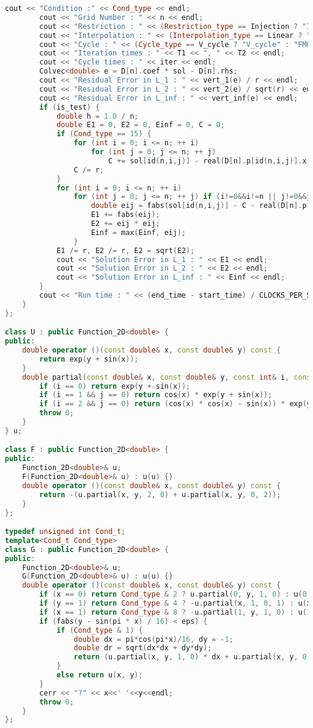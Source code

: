 \documentclass{ctexart}
\begin{document}
\begin{lstlisting}[language=c++]
		cout << "Condition :" << Cond_type << endl;
		cout << "Grid Number : " << n << endl;
		cout << "Restriction : " << (Restriction_type == Injection ? "Injection" : "Full Weighting") << endl;
		cout << "Interpolation : " << (Interpolation_type == Linear ? "Linear" : "Quadratic") << endl;
		cout << "Cycle : " << (Cycle_type == V_cycle ? "V_cycle" : "FMG") << endl;
		cout << "Iteration times : " << T1 << ", " << T2 << endl;
		cout << "Cycle times : " << iter << endl;
		Colvec<double> e = D[n].coef * sol - D[n].rhs;
		cout << "Residual Error in L_1 : " << vert_1(e) / r << endl;
		cout << "Residual Error in L_2 : " << vert_2(e) / sqrt(r) << endl;
		cout << "Residual Error in L_inf : " << vert_inf(e) << endl;
		if (is_test) {
			double h = 1.0 / n;
			double E1 = 0, E2 = 0, Einf = 0, C = 0;
			if (Cond_type == 15) {
				for (int i = 0; i <= n; ++ i)
					for (int j = 0; j <= n; ++ j)
						C += sol[id(n,i,j)] - real(D[n].p[id(n,i,j)].x, D[n].p[id(n,i,j)].y);
				C /= r;
			}
			for (int i = 0; i <= n; ++ i)
				for (int j = 0; j <= n; ++ j) if (i!=0&&i!=n || j!=0&&j!=n){
					double eij = fabs(sol[id(n,i,j)] - C - real(D[n].p[id(n,i,j)].x, D[n].p[id(n,i,j)].y));
					E1 += fabs(eij);
					E2 += eij * eij;
					Einf = max(Einf, eij);
				}
			E1 /= r, E2 /= r, E2 = sqrt(E2);
			cout << "Solution Error in L_1 : " << E1 << endl;
			cout << "Solution Error in L_2 : " << E2 << endl;
			cout << "Solution Error in L_inf : " << Einf << endl;
		}
		cout << "Run time : " << (end_time - start_time) / CLOCKS_PER_SEC << endl;
	}
};

class U : public Function_2D<double> {
public:
	double operator ()(const double& x, const double& y) const {
		return exp(y + sin(x));
	}
	double partial(const double& x, const double& y, const int& i, const int& j) const {
		if (i == 0) return exp(y + sin(x));
		if (i == 1 && j == 0) return cos(x) * exp(y + sin(x));
		if (i == 2 && j == 0) return (cos(x) * cos(x) - sin(x)) * exp(y + sin(x));
		throw 0;
	}
} u;

class F : public Function_2D<double> {
public:
	Function_2D<double>& u;
	F(Function_2D<double>& u) : u(u) {}
	double operator ()(const double& x, const double& y) const {
		return -(u.partial(x, y, 2, 0) + u.partial(x, y, 0, 2));
	}
};

typedef unsigned int Cond_t;
template<Cond_t Cond_type>
class G : public Function_2D<double> {
public:
	Function_2D<double>& u;
	G(Function_2D<double>& u) : u(u) {}
	double operator ()(const double& x, const double& y) const {
		if (x == 0) return Cond_type & 2 ? u.partial(0, y, 1, 0) : u(0, y) ;
		if (y == 1) return Cond_type & 4 ? -u.partial(x, 1, 0, 1) : u(x, 1);
		if (x == 1) return Cond_type & 8 ? -u.partial(1, y, 1, 0) : u(1, y);
		if (fabs(y - sin(pi * x) / 16) < eps) {
			if (Cond_type & 1) {
				double dx = pi*cos(pi*x)/16, dy = -1;
				double dr = sqrt(dx*dx + dy*dy);
				return (u.partial(x, y, 1, 0) * dx + u.partial(x, y, 0, 1) * dy) / dr;
			}
			else return u(x, y);
		}
		cerr << "?" << x<<' '<<y<<endl;
		throw 0;
	}
};


\end{lstlisting}
\end{document}
